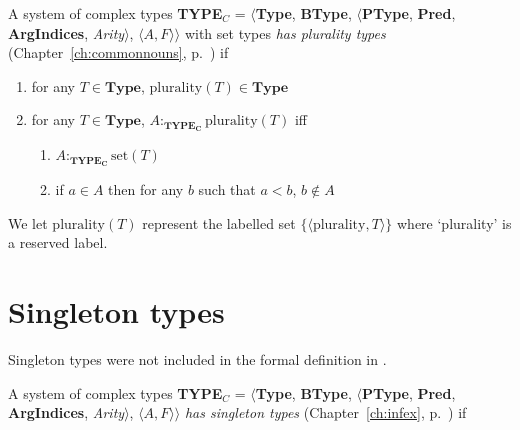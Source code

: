 A system of complex types {\bf TYPE$_C$} = $\langle${\bf Type}, {\bf BType},
$\langle$\textbf{PType}, {\bf Pred}, \textbf{ArgIndices}, {\it
  Arity\/}$\rangle$, $\langle A,F\rangle$$\rangle$ with set types
\textit{has plurality types} (Chapter~\ref{ch:commonnouns},
p.~\pageref{ex:plurality-types}) if
\begin{enumerate} 
 
\item for any $T \in \textbf{Type}$, $\mathrm{plurality}(T) \in \textbf{Type}$ 
 
\item for any $T \in \textbf{Type}$, 
$A:_{\mathbf{TYPE_C}}\mathrm{plurality}(T)$ iff  
\begin{enumerate} 
 
\item $A :_{\mathbf{TYPE_C}} \mathrm{set}(T)$ 
 
\item if $a\in A$ then for any $b$ such that $a<b$, $b\not\in A$ 
 
\end{enumerate} 
  
   
 
\end{enumerate}

We let $\mathrm{plurality}(T)$ represent the labelled set
$\{\langle\text{plurality},T\rangle\}$ where `plurality' is a reserved
label. 

\section{Singleton types}
\label{app:singletontypes}

Singleton types were not included in the formal definition in \cite{Cooper2012}.

A system of complex types {\bf TYPE$_C$} = $\langle${\bf Type}, {\bf BType},
$\langle$\textbf{PType}, {\bf Pred}, \textbf{ArgIndices}, {\it
  Arity\/}$\rangle$, $\langle A,F\rangle$$\rangle$ \textit{has
  singleton types} (Chapter~\ref{ch:infex}, p.~\pageref{ex:singleton-types}) if
 
 
   

